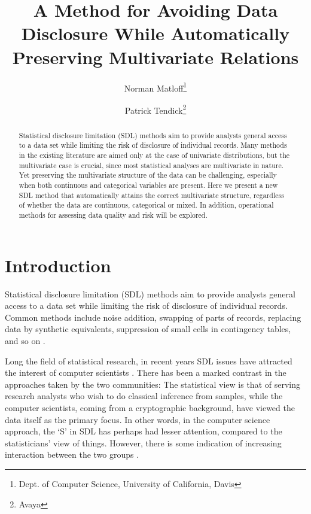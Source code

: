 \documentclass[11pt]{article}
\title{A Method for Avoiding Data Disclosure While
Automatically Preserving Multivariate Relations}
\author{
Norman Matloff\thanks{Dept. of Computer Science, University of
California, Davis}
\and
Patrick Tendick\thanks{Avaya}
}
\begin{document}
\maketitle

\begin{abstract}

\noindent 
Statistical disclosure limitation (SDL) methods aim to provide analysts
general access to a data set while limiting the risk of disclosure of
individual records.  Many methods in the existing literature are 
aimed only at the case of univariate distributions, but the 
multivariate case is crucial, since most statistical analyses are 
multivariate in nature.  Yet preserving the multivariate structure of 
the data can be challenging, especially when both continuous and
categorical variables are present.  Here we present a new SDL method 
that automatically attains the correct multivariate structure,
regardless of whether the data are continuous, categorical or mixed.  In
addition, operational methods for assessing data quality and risk will
be explored.

\end{abstract}

\section{Introduction}

Statistical disclosure limitation (SDL) methods aim to provide analysts
general access to a data set while limiting the risk of disclosure of
individual records.  Common methods include noise addition, swapping of
parts of records, replacing data by synthetic equivalents, suppression
of small cells in contingency tables, and so on \cite{duncan}. 


Long the field of statistical research, in recent years SDL issues have
attracted the interest of computer scientists \cite{dwork}.  There has
been a marked contrast in the approaches taken by the two communities:
The statistical view is that of serving research analysts who wish to do
classical inference from samples, while the computer scientists, coming
from a cryptographic background, have viewed the data itself as the
primary focus.  In other words, in the computer science approach, the
`S' in SDL has perhaps had lesser attention, compared to the
statisticians' view of things.  However, there is some indication of
increasing interaction between the two groups \cite{abowd} \cite{duchi}.
\end{document}
